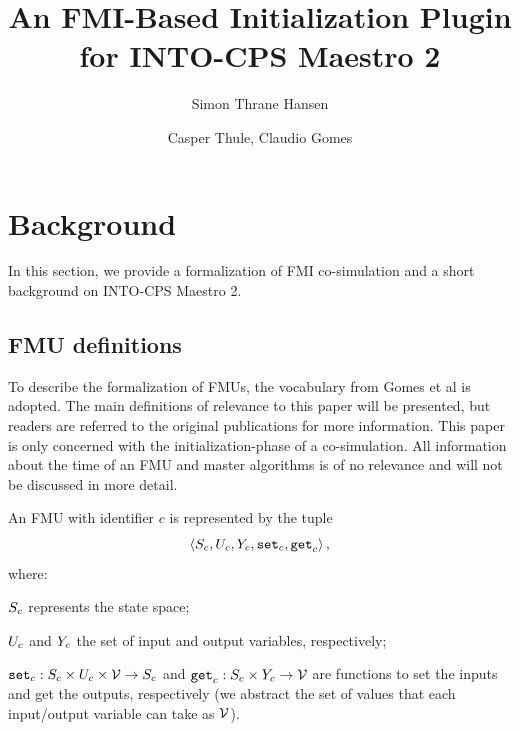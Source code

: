 \documentclass[runningheads]{llncs}
\begin{document}
%
\title{An FMI-Based Initialization Plugin for INTO-CPS Maestro 2}
%
%
\author{Simon Thrane Hansen \and
Casper Thule,
Claudio Gomes }
%
%
%
\maketitle              %
%






\section{Background}\label{sc:background}
In this section, we provide a formalization of FMI co-simulation and a short background on INTO-CPS Maestro 2.

\subsection{FMU definitions}
To describe the formalization of FMUs, the vocabulary from Gomes et al\cite{gomes_lucio_vangheluwe_2019, Gomes2018} is adopted. The main definitions of relevance to this paper will be presented, but readers are referred to the original publications for more information. This paper is only concerned with the initialization-phase of a co-simulation. All information about the time of an FMU and master algorithms is of no relevance and will not be discussed in more detail. 
\begin{definition}[FMU]\label{def:fmu}
  An FMU with identifier $c$ is represented by the tuple   
  $$ \left\langle S_{c}, U_{c}, Y_{c}, \mathtt{set}_{c}, \mathtt{get}_{c} \right\rangle ,$$
  where:
  \begin{inparadesc}
    \item $S_{c}$ represents the state space;
    \item $U_{c}$ and $Y_{c}$ the set of input and output variables, respectively;
    \item $\mathtt{set}_{c} : S_{c} \times U_{c} \times \mathcal{V} \to S_{c}$ and $\mathtt{get}_{c}: S_{c} \times Y_{c} \to \mathcal{V}$ are functions to set the inputs and get the outputs, respectively (we abstract the set of values that each input/output variable can take as $\mathcal{V}$).
  \end{inparadesc}
\end{definition}
\end{document}
